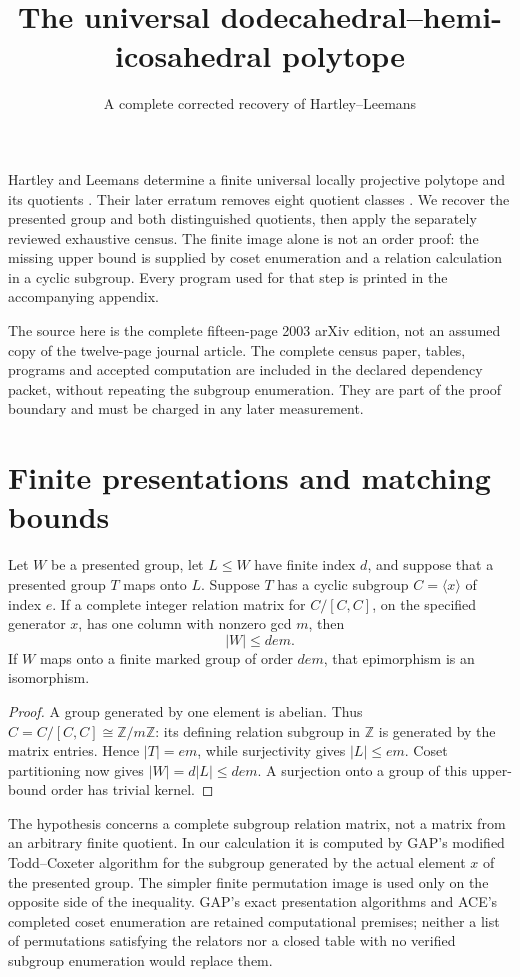 \documentclass[11pt,a4paper]{article}
\title{The universal dodecahedral--hemi-icosahedral polytope}
\author{A complete corrected recovery of Hartley--Leemans}
\date{}
\begin{document}
\maketitle
Hartley and Leemans determine a finite universal locally projective polytope and its quotients \cite{source}. Their later erratum removes eight quotient classes \cite{erratum}. We recover the presented group and both distinguished quotients, then apply the separately reviewed exhaustive census. The finite image alone is not an order proof: the missing upper bound is supplied by coset enumeration and a relation calculation in a cyclic subgroup. Every program used for that step is printed in the accompanying appendix.

The source here is the complete fifteen-page 2003 arXiv edition, not an assumed copy of the twelve-page journal article. The complete census paper, tables, programs and accepted computation are included in the declared dependency packet, without repeating the subgroup enumeration. They are part of the proof boundary and must be charged in any later measurement.

\section{Finite presentations and matching bounds}
\begin{lemma}\label{bound}
Let $W$ be a presented group, let $L\leq W$ have finite index $d$, and suppose that a presented group $T$ maps onto $L$. Suppose $T$ has a cyclic subgroup $C=\langle x\rangle$ of index $e$. If a complete integer relation matrix for $C/[C,C]$, on the specified generator $x$, has one column with nonzero gcd $m$, then
\[
 |W|\leq dem.
\]
If $W$ maps onto a finite marked group of order $dem$, that epimorphism is an isomorphism.
\end{lemma}
\begin{proof}
A group generated by one element is abelian. Thus $C=C/[C,C]\cong\mathbb Z/m\mathbb Z$: its defining relation subgroup in $\mathbb Z$ is generated by the matrix entries. Hence $|T|=em$, while surjectivity gives $|L|\leq em$. Coset partitioning now gives $|W|=d|L|\leq dem$. A surjection onto a group of this upper-bound order has trivial kernel.
\end{proof}
The hypothesis concerns a complete subgroup relation matrix, not a matrix from an arbitrary finite quotient. In our calculation it is computed by GAP's modified Todd--Coxeter algorithm for the subgroup generated by the actual element $x$ of the presented group. The simpler finite permutation image is used only on the opposite side of the inequality. GAP's exact presentation algorithms and ACE's completed coset enumeration are retained computational premises; neither a list of permutations satisfying the relators nor a closed table with no verified subgroup enumeration would replace them.
\end{document}
